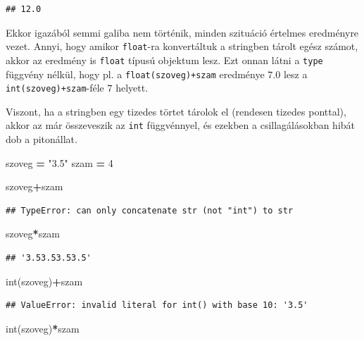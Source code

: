 \documentclass[
]{book}
\newenvironment{Shaded}{\begin{snugshade}}{\end{snugshade}}
\newcommand{\BuiltInTok}[1]{#1}
\newcommand{\DecValTok}[1]{\textcolor[rgb]{0.00,0.00,0.81}{#1}}
\newcommand{\NormalTok}[1]{#1}
\newcommand{\OperatorTok}[1]{\textcolor[rgb]{0.81,0.36,0.00}{\textbf{#1}}}
\newcommand{\StringTok}[1]{\textcolor[rgb]{0.31,0.60,0.02}{#1}}
\begin{document}
\begin{verbatim}
## 12.0
\end{verbatim}

Ekkor igazából semmi galiba nem történik, minden szituáció értelmes eredményre vezet. Annyi, hogy amikor \texttt{float}-ra konvertáltuk a stringben tárolt egész számot, akkor az eredmény is \texttt{float} típusú objektum lesz. Ezt onnan látni a \texttt{type} függvény nélkül, hogy pl. a \texttt{float(szoveg)+szam} eredménye \(7.0\) lesz a \texttt{int(szoveg)+szam}-féle \(7\) helyett.

Viszont, ha a stringben egy tizedes törtet tárolok el (rendesen tizedes ponttal), akkor az már összeveszik az \texttt{int} függvénnyel, és ezekben a csillagálásokban hibát dob a pitonállat.

\begin{Shaded}
\begin{Highlighting}[]
\NormalTok{szoveg }\OperatorTok{=} \StringTok{"3.5"}
\NormalTok{szam }\OperatorTok{=} \DecValTok{4}

\NormalTok{szoveg}\OperatorTok{+}\NormalTok{szam}
\end{Highlighting}
\end{Shaded}

\begin{verbatim}
## TypeError: can only concatenate str (not "int") to str
\end{verbatim}

\begin{Shaded}
\begin{Highlighting}[]
\NormalTok{szoveg}\OperatorTok{*}\NormalTok{szam}
\end{Highlighting}
\end{Shaded}

\begin{verbatim}
## '3.53.53.53.5'
\end{verbatim}

\begin{Shaded}
\begin{Highlighting}[]
\BuiltInTok{int}\NormalTok{(szoveg)}\OperatorTok{+}\NormalTok{szam}
\end{Highlighting}
\end{Shaded}

\begin{verbatim}
## ValueError: invalid literal for int() with base 10: '3.5'
\end{verbatim}

\begin{Shaded}
\begin{Highlighting}[]
\BuiltInTok{int}\NormalTok{(szoveg)}\OperatorTok{*}\NormalTok{szam}
\end{Highlighting}
\end{Shaded}
\end{document}
